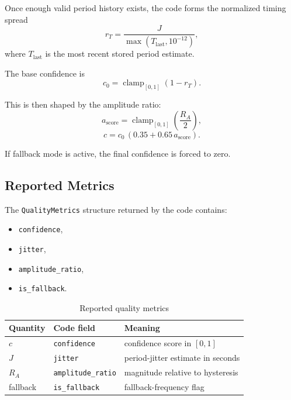 \documentclass[conference]{IEEEtran}
\begin{document}
    Once enough valid period history exists, the code forms the normalized timing
    spread
    \begin{equation}
        r_T = \frac{J}{\max(T_{\mathrm{last}},10^{-12})},
    \end{equation}
    where \(T_{\mathrm{last}}\) is the most recent stored period estimate.

    The base confidence is
    \begin{equation}
        c_0 = \operatorname{clamp}_{[0,1]}(1-r_T).
    \end{equation}

    This is then shaped by the amplitude ratio:
    \begin{equation}
        a_{\mathrm{score}}
        =
        \operatorname{clamp}_{[0,1]}\!\left(\frac{R_A}{2}\right),
    \end{equation}
    \begin{equation}
        c = c_0\,(0.35 + 0.65\,a_{\mathrm{score}}).
    \end{equation}

    If fallback mode is active, the final confidence is forced to zero.

    \subsection{Reported Metrics}

    The \texttt{QualityMetrics} structure returned by the code contains:
    \begin{itemize}[leftmargin=1.4em]
        \item \texttt{confidence},
        \item \texttt{jitter},
        \item \texttt{amplitude\_ratio},
        \item \texttt{is\_fallback}.
    \end{itemize}

    \begin{table}[t]
        \centering
        \caption{Reported quality metrics}
        \label{tab:quality}
        \small
        \begin{tabular}{@{}lll@{}}
            \toprule
            Quantity & Code field & Meaning \\
            \midrule
            \(c\) & \texttt{confidence} & confidence score in \([0,1]\) \\
            \(J\) & \texttt{jitter} & period-jitter estimate in seconds \\
            \(R_A\) & \texttt{amplitude\_ratio} & magnitude relative to hysteresis \\
            fallback & \texttt{is\_fallback} & fallback-frequency flag \\
            \bottomrule
        \end{tabular}
    \end{table}
\end{document}
